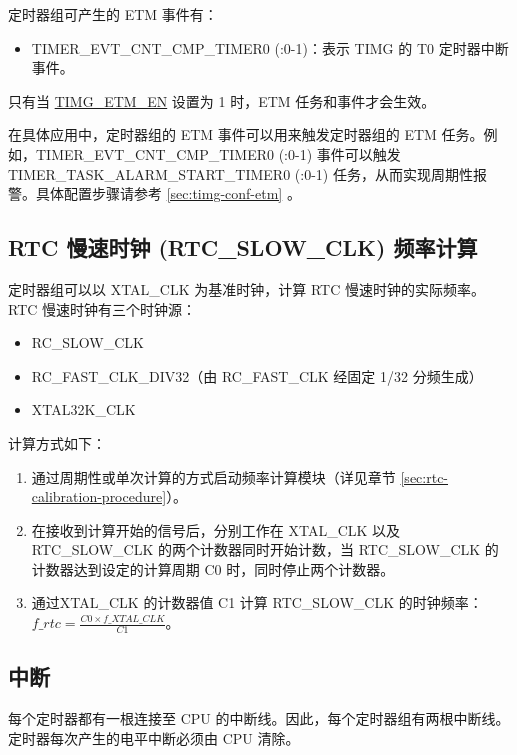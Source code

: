 \documentclass[main\_\_CN.tex]{subfiles}
\begin{document}
定时器组可产生的 ETM 事件有：

\begin{itemize}
\item TIMER\_EVT\_CNT\_CMP\_TIMER0 (:0-1)：表示 TIMG 的 T0 定时器中断事件。
\end{itemize}

只有当 \hyperref[fielddesc:TIMGETMEN]{TIMG\_ETM\_EN} 设置为 1 时，ETM 任务和事件才会生效。

在具体应用中，定时器组的 ETM 事件可以用来触发定时器组的 ETM 任务。例如，TIMER\_EVT\_CNT\_CMP\_TIMER0 (:0-1) 事件可以触发 TIMER\_TASK\_ALARM\_START\_TIMER0 (:0-1) 任务，从而实现周期性报警。具体配置步骤请参考 \ref{sec:timg-conf-etm} 。


\subsection{RTC 慢速时钟 (RTC\_SLOW\_CLK) 频率计算}\label{sec:rtc-calibration-desc}

定时器组可以以 XTAL\_CLK 为基准时钟，计算 RTC 慢速时钟的实际频率。RTC 慢速时钟有三个时钟源：

\begin{itemize}
    \item RC\_SLOW\_CLK
    \item RC\_FAST\_CLK\_DIV32（由 RC\_FAST\_CLK 经固定 1/32 分频生成）
    \item XTAL32K\_CLK
\end{itemize}

计算方式如下：

\begin{enumerate}
    \item 通过周期性或单次计算的方式启动频率计算模块（详见章节 \ref{sec:rtc-calibration-procedure}）。
    \item 在接收到计算开始的信号后，分别工作在 XTAL\_CLK 以及 RTC\_SLOW\_CLK 的两个计数器同时开始计数，当 RTC\_SLOW\_CLK 的计数器达到设定的计算周期 C0 时，同时停止两个计数器。
    \item 通过XTAL\_CLK 的计数器值 C1 计算 RTC\_SLOW\_CLK 的时钟频率：$f\_rtc = \frac{C0 \times f\_XTAL\_CLK}{C1}$。
\end{enumerate}

\subsection{中断}\label{sec:timg-interrupt}
每个定时器都有一根连接至 CPU 的中断线。因此，每个定时器组有两根中断线。定时器每次产生的电平中断必须由 CPU 清除。
\end{document}
